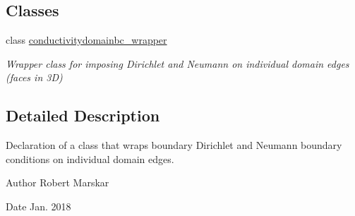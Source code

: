 \subsection*{Classes}
\begin{DoxyCompactItemize}
\item 
class \hyperlink{classconductivitydomainbc__wrapper}{conductivitydomainbc\+\_\+wrapper}
\begin{DoxyCompactList}\small\item\em Wrapper class for imposing Dirichlet and Neumann on individual domain edges (faces in 3D) \end{DoxyCompactList}\end{DoxyCompactItemize}


\subsection{Detailed Description}
Declaration of a class that wraps boundary Dirichlet and Neumann boundary conditions on individual domain edges. 

\begin{DoxyAuthor}{Author}
Robert Marskar 
\end{DoxyAuthor}
\begin{DoxyDate}{Date}
Jan. 2018 
\end{DoxyDate}
